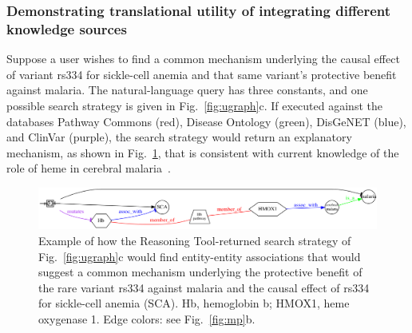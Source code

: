\documentclass[11pt,notitlepage]{article}
\begin{document}
\subsubsection{Demonstrating translational utility of integrating different knowledge sources}
Suppose a user wishes to find a common mechanism %
underlying the causal effect of variant rs334 for sickle-cell anemia and that
same variant's protective benefit against malaria. The natural-language query
has three constants, %
and one possible search strategy is given in 
 Fig.~\ref{fig:ugraph}c. If executed against the
databases Pathway Commons (red), Disease Ontology (green), DisGeNET (blue), and
ClinVar (purple), the search strategy would return an explanatory mechanism, as
shown in Fig.~\ref{fig:malaria}, that is consistent with current knowledge of
the role of heme in cerebral malaria~\cite{Ferreira:2011ff}.
\begin{figure}[htbp]
  \begin{center}
    \includegraphics[width=6in]{net5.png}
  \end{center}
    \caption{Example of how the Reasoning Tool-returned search strategy of
      Fig.~\ref{fig:ugraph}c would find entity-entity associations that would
      suggest a common mechanism underlying the protective benefit of the rare
      variant rs334 against malaria and the causal effect of rs334 for
      sickle-cell anemia (SCA). Hb, hemoglobin b; HMOX1, heme
      oxygenase 1.  Edge colors: see Fig.~\ref{fig:mp}b.}
  \label{fig:malaria}
\end{figure}
\end{document}
